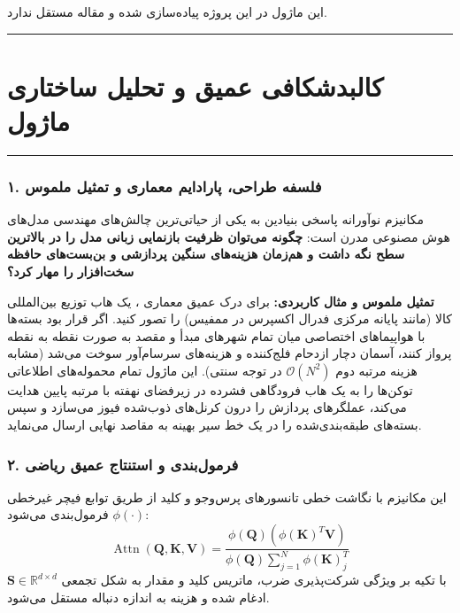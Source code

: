 \clearpage
{}
\vspace*{0.2cm}

این ماژول در این پروژه پیاده‌سازی شده و مقاله مستقل ندارد.
\noindent\rule{\textwidth}{1.2pt}
\vspace*{0.1cm}
\section{کالبدشکافی عمیق و تحلیل ساختاری ماژول }
\label{sec:mod_SOAFusedAttention}
\vspace*{-0.2cm}
\noindent\rule{\textwidth}{0.5pt}
\vspace*{0.3cm}

\subsubsection*{۱. فلسفه طراحی، پارادایم معماری و تمثیل ملموس}
مکانیزم نوآورانه  پاسخی بنیادین به یکی از حیاتی‌ترین چالش‌های مهندسی مدل‌های هوش مصنوعی مدرن است: \textbf{چگونه می‌توان ظرفیت بازنمایی زبانی مدل را در بالاترین سطح نگه داشت و هم‌زمان هزینه‌های سنگین پردازشی و بن‌بست‌های حافظه سخت‌افزار را مهار کرد؟}

\textbf{تمثیل ملموس و مثال کاربردی:}
برای درک عمیق معماری ، یک هاب توزیع بین‌المللی کالا (مانند پایانه مرکزی فدرال اکسپرس در ممفیس) را تصور کنید. اگر قرار بود بسته‌ها با هواپیماهای اختصاصی میان تمام شهرهای مبدأ و مقصد به صورت نقطه به نقطه پرواز کنند، آسمان دچار ازدحام فلج‌کننده و هزینه‌های سرسام‌آور سوخت می‌شد (مشابه هزینه مرتبه دوم $\mathcal{O}(N^2)$ در توجه سنتی). این ماژول تمام محموله‌های اطلاعاتی توکن‌ها را به یک هاب فرودگاهی فشرده در زیرفضای نهفته با مرتبه پایین هدایت می‌کند، عملگرهای پردازش را درون کرنل‌های ذوب‌شده فیوز می‌سازد و سپس بسته‌های طبقه‌بندی‌شده را در یک خط سیر بهینه به مقاصد نهایی ارسال می‌نماید.

\subsubsection*{۲. فرمول‌بندی و استنتاج عمیق ریاضی }
این مکانیزم با نگاشت خطی تانسورهای پرس‌وجو و کلید از طریق توابع فیچر غیرخطی $\phi(\cdot)$ فرمول‌بندی می‌شود:
\begin{equation}
\operatorname{Attn}(\mathbf{Q}, \mathbf{K}, \mathbf{V}) = \frac{\phi(\mathbf{Q}) \left(\phi(\mathbf{K})^T \mathbf{V}\right)}{\phi(\mathbf{Q}) \sum_{j=1}^N \phi(\mathbf{K})_j^T}
\end{equation}
با تکیه بر ویژگی شرکت‌پذیری ضرب، ماتریس کلید و مقدار به شکل تجمعی $\mathbf{S} \in \mathbb{R}^{d \times d}$ ادغام شده و هزینه به اندازه دنباله مستقل می‌شود.

